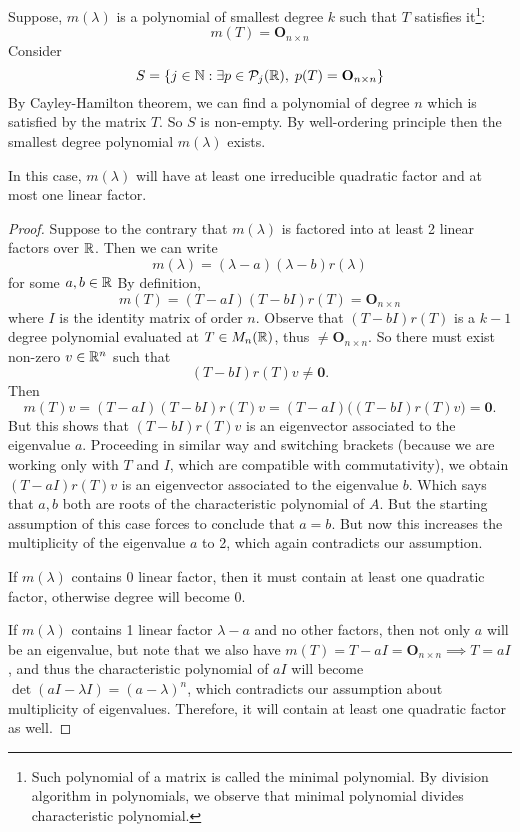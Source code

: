 \documentclass[11pt, a4paper, abstract=true]{scrartcl}
\begin{document}
\begin{soln}
    Suppose, \(m(\lambda)\) is a polynomial of smallest degree \(k\) such that \(T\) satisfies it\footnote[1]{Such polynomial of a matrix is called the minimal polynomial. By division algorithm in polynomials, we observe that minimal polynomial divides characteristic polynomial.}: \[m(T) = \mathbf{O}_{n \times n}\]
    Consider \[S = \{j \in \mathbb N: \exists p \in \mathcal{P}_j(\mathbb R), \; p(T) = \mathbf{O}_{n \times n}\}\]
    By Cayley-Hamilton theorem, we can find a polynomial of degree \(n\) which is satisfied by the matrix \(T\). So \(S\) is non-empty. By well-ordering principle then the smallest degree polynomial \(m(\lambda)\) exists.
    \begin{claim*}[2]
        In this case, \(m(\lambda)\) will have at least one irreducible quadratic factor and at most one linear factor.
    \end{claim*}
    \begin{proof}
        Suppose to the contrary that \(m(\lambda)\) is factored into at least 2 linear factors over \( \mathbb R\). Then we can write \[m(\lambda) = (\lambda - a)(\lambda - b)r(\lambda)\] for some \(a,b \in \mathbb R\)
        By definition, \[m(T) = (T - aI)(T - bI)r(T) = \mathbf{O}_{n \times n}\] where \(I\) is the identity matrix of order \(n\). Observe that \((T - bI)r(T)\) is a \(k-1\) degree polynomial evaluated at \(T \in M_n(\mathbb R)\), thus \(\neq \mathbf{O}_{n \times n}\). So there must exist non-zero \(v \in \mathbb R^n\) such that \[(T - bI)r(T)v \neq \mathbf{0}.\] Then \[m(T)v = (T - aI)(T - bI)r(T)v = (T - aI)\big((T - bI)r(T)v\big) = \mathbf{0}.\] But this shows that \((T - bI)r(T)v\) is an eigenvector associated to the eigenvalue \(a\). Proceeding in similar way and switching brackets (because we are working only with \(T\) and \(I\), which are compatible with commutativity), we obtain \((T - aI)r(T)v\) is an eigenvector associated to the eigenvalue \(b\). Which says that \(a, b\) both are roots of the characteristic polynomial of \(A\). But the starting assumption of this case forces to conclude that \(a = b\). But now this increases the multiplicity of the eigenvalue \(a\) to 2, which again contradicts our assumption.

        If \(m(\lambda)\) contains 0 linear factor, then it must contain at least one quadratic factor, otherwise degree will become 0. 
    
        If \(m(\lambda)\) contains 1 linear factor \(\lambda - a\) and no other factors, then not only \(a\) will be an eigenvalue, but note that we also have \(m(T) = T - aI = \mathbf{O}_{n \times n} \implies T = aI\), and thus the characteristic polynomial of \(aI\) will become \(\det(aI-\lambda I) = (a-\lambda)^n\), which contradicts our assumption about multiplicity of eigenvalues. Therefore, it will contain at least one quadratic factor as well.
    \end{proof}


\end{soln}
\end{document}
